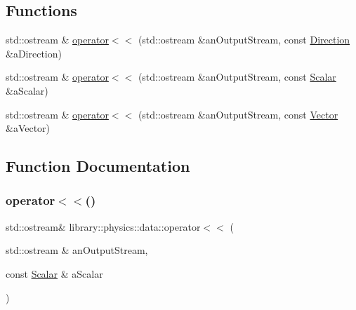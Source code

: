 \subsection*{Functions}
\begin{DoxyCompactItemize}
\item 
std\+::ostream \& \hyperlink{namespacelibrary_1_1physics_1_1data_ab8943251539d57e6cfc3c11d2d89b5e0}{operator$<$$<$} (std\+::ostream \&an\+Output\+Stream, const \hyperlink{classlibrary_1_1physics_1_1data_1_1_direction}{Direction} \&a\+Direction)
\item 
std\+::ostream \& \hyperlink{namespacelibrary_1_1physics_1_1data_a12c5a278c6886b3c6b0a0a67f5d45ce5}{operator$<$$<$} (std\+::ostream \&an\+Output\+Stream, const \hyperlink{classlibrary_1_1physics_1_1data_1_1_scalar}{Scalar} \&a\+Scalar)
\item 
std\+::ostream \& \hyperlink{namespacelibrary_1_1physics_1_1data_af3e315ce4029e709d1589d700c92efda}{operator$<$$<$} (std\+::ostream \&an\+Output\+Stream, const \hyperlink{classlibrary_1_1physics_1_1data_1_1_vector}{Vector} \&a\+Vector)
\end{DoxyCompactItemize}


\subsection{Function Documentation}
\mbox{\label{namespacelibrary_1_1physics_1_1data_a12c5a278c6886b3c6b0a0a67f5d45ce5}} 
\subsubsection{\texorpdfstring{operator$<$$<$()}{operator<<()}\hspace{0.1cm}{\footnotesize\ttfamily [1/3]}}
{\footnotesize\ttfamily std\+::ostream\& library\+::physics\+::data\+::operator$<$$<$ (\begin{DoxyParamCaption}\item[{std\+::ostream \&}]{an\+Output\+Stream,  }\item[{const \hyperlink{classlibrary_1_1physics_1_1data_1_1_scalar}{Scalar} \&}]{a\+Scalar }\end{DoxyParamCaption})}

\mbox{\label{namespacelibrary_1_1physics_1_1data_af3e315ce4029e709d1589d700c92efda}} 
